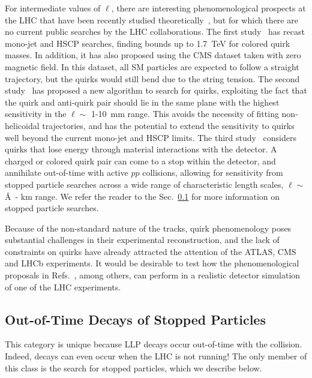 For intermediate values of $\ell$, there are interesting phenomenological prospects at the LHC that have been recently studied theoretically~\cite{Farina:2017cts,Knapen:2017kly,Evans:2018jmd}, but for which there are no current public searches by the LHC collaborations. The first study~\cite{Farina:2017cts} has recast mono-jet and HSCP searches, finding bounds up to 1.7~TeV for colored quirk masses. In addition, it has also proposed using the CMS dataset taken with zero magnetic field. In this dataset, all SM particles are expected to follow a straight trajectory, but the quirks would still bend due to the string tension. The second study~\cite{Knapen:2017kly} has proposed a new algorithm to search for quirks, exploiting the fact that the quirk and anti-quirk pair should lie in the same plane with the highest sensitivity in the $\ell \sim$ 1-10~mm range. This avoids the necessity of fitting non-helicoidal trajectories, and has the potential to extend the sensitivity to quirks well beyond the current mono-jet and HSCP limits. The third study~\cite{Evans:2018jmd} considers quirks that lose energy through material interactions with the detector.  A charged or colored quirk pair can come to a stop within the detector, and annihilate out-of-time with active $pp$ collisions, allowing for sensitivity from stopped particle searches across a wide range of characteristic length scales, $\ell \sim$ \AA\ - km range.  We refer the reader to the Sec.~\ref{sec:outoftime} for more information on stopped particle searches.

Because of the non-standard nature of the tracks, quirk phenomenology poses substantial challenges in their experimental reconstruction, and the lack of constraints on quirks have already attracted the attention of the ATLAS, CMS and LHCb experiments. It would be desirable to test how the phenomenological proposals in Refs.~\cite{Farina:2017cts,Knapen:2017kly,Evans:2018jmd}, among others, can perform in a realistic detector simulation of one of the LHC experiments.



\subsection{Out-of-Time Decays of Stopped Particles}
\label{sec:outoftime}

This category is unique because LLP decays occur out-of-time with the collision. Indeed, decays can even occur when the LHC is not running! The only member of this class is the search for stopped particles, which we describe below.

